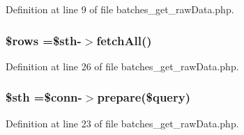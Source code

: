 Definition at line 9 of file batches\-\_\-get\-\_\-raw\-Data.\-php.

\hypertarget{batches__get__raw_data_8php_ace2ec39e7df3899fa8df9640ec274b03}{
\subsubsection[{\$rows}]{\setlength{\rightskip}{0pt plus 5cm}\$rows =\$sth-\/$>$fetch\-All()}}\label{batches__get__raw_data_8php_ace2ec39e7df3899fa8df9640ec274b03}


Definition at line 26 of file batches\-\_\-get\-\_\-raw\-Data.\-php.

\hypertarget{batches__get__raw_data_8php_afa9126f9664959c02795be300a135f93}{
\subsubsection[{\$sth}]{\setlength{\rightskip}{0pt plus 5cm}\$sth =\$conn-\/$>$prepare(\$query)}}\label{batches__get__raw_data_8php_afa9126f9664959c02795be300a135f93}


Definition at line 23 of file batches\-\_\-get\-\_\-raw\-Data.\-php.


